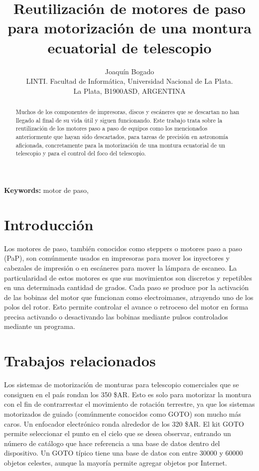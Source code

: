 \documentclass[final,narroweqnarray,inline,twoside]{ieee}
\author{Joaquín Bogado
\\LINTI. Facultad de Informática, Universidad Nacional de La Plata.
\\La Plata, B1900ASD, ARGENTINA
}
\title{Reutilización de motores de paso para motorización de una montura ecuatorial de telescopio}
\begin{document}
\maketitle
\sloppy

\begin{abstract}
Muchos de los componentes de impresoras, discos y escáneres que se descartan no han llegado al final de su vida útil y
siguen funcionando.
Este trabajo trata sobre la reutilización de los motores paso a paso de equipos como los mencionados anteriormente que hayan
sido descartados, para tareas de precisión en astronomía aficionada, concretamente para la motorización de una montura
ecuatorial de un telescopio y para el control del foco del telescopio.
\end{abstract}

\noindent \textbf{Keywords: } motor de paso, 

\section{Introducción}
Los motores de paso, también conocidos como steppers o motores paso a paso (PaP), son comúnmente usados en impresoras para
mover los inyectores y cabezales de impresión o en escáneres para mover la lámpara de escaneo. La particularidad de estos
motores es que sus movimientos son discretos y repetibles en una determinada cantidad de grados. Cada paso se produce por la
activación de las bobinas del motor que funcionan como electroimanes, atrayendo uno de los polos del rotor. Esto permite
controlar el avance o retroceso del motor en forma precisa activando o desactivando las bobinas mediante pulsos controlados
mediante un programa.
\section{Trabajos relacionados}
Los sistemas de motorización de monturas para telescopio comerciales que se consiguen en el país rondan los 350 \$AR. Esto
es solo para motorizar la montura con el fin de contrarrestar el movimiento de rotación terrestre, ya que los sistemas
motorizados de guiado (comúnmente conocidos como GOTO) son mucho más caros. Un enfocador electrónico ronda alrededor de los
320 \$AR. El kit GOTO permite seleccionar el punto en el cielo que se desea observar, entrando un número de catálogo que hace
referencia a una base de datos dentro del dispositivo. Un GOTO típico tiene una base de datos con entre 30000 y 60000 objetos
celestes, aunque la mayoría permite agregar objetos por Internet.
\end{document}
